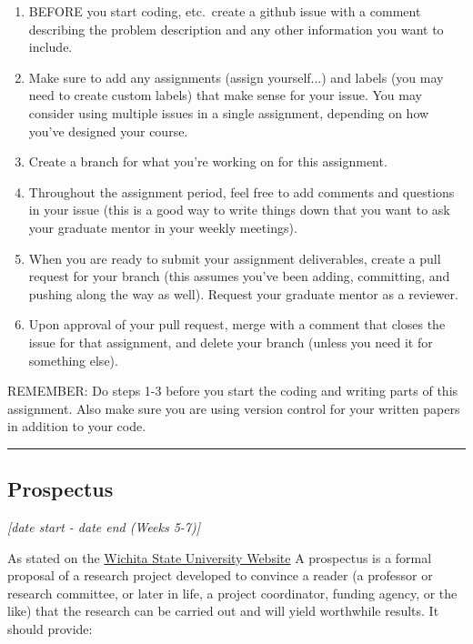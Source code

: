 \documentclass[12pt]{article}
\begin{document}
\begin{enumerate}
	\item BEFORE you start coding, etc.~create a github issue with a comment describing the problem description and any other information you want to include.
	\item Make sure to add any assignments (assign yourself...) and labels (you may need to create custom labels) that make sense for your issue. You may consider using multiple issues in a single assignment, depending on how you've designed your course.
	\item Create a branch for what you're working on for this assignment.
	\item Throughout the assignment period, feel free to add comments and questions in your issue (this is a good way to write things down that you want to ask your graduate mentor in your weekly meetings).
	\item When you are ready to submit your assignment deliverables, create a pull request for your branch (this assumes you've been adding, committing, and pushing along the way as well). Request your graduate mentor as a reviewer.
	\item Upon approval of your pull request, merge with a comment that closes the issue for that assignment, and delete your branch (unless you need it for something else).
\end{enumerate}

\noindent REMEMBER: Do steps 1-3 before you start the coding and writing parts of this assignment. Also make sure you are using version control for your written papers in addition to your code.



\vspace{1em}\hrule\vspace{1em}
\subsection{Prospectus}
\label{ssec:prospectus}
\textit{[date start - date end (Weeks 5-7)]}

\bigskip

As stated on the \href{https://www.wichita.edu/academics/fairmount_college_of_liberal_arts_and_sciences/english/deptenglish/WritingaResearchProspectus.php#:~:text=A%20prospectus%20is%20a%20formal,and%20will%20yield%20worthwhile%20results.}{Wichita State University Website}
A prospectus is a formal proposal of a research project developed to convince a reader (a professor or research committee, or later in life, a project coordinator, funding agency, or the like) that the research can be carried out and will yield worthwhile results. It should provide:
\end{document}
